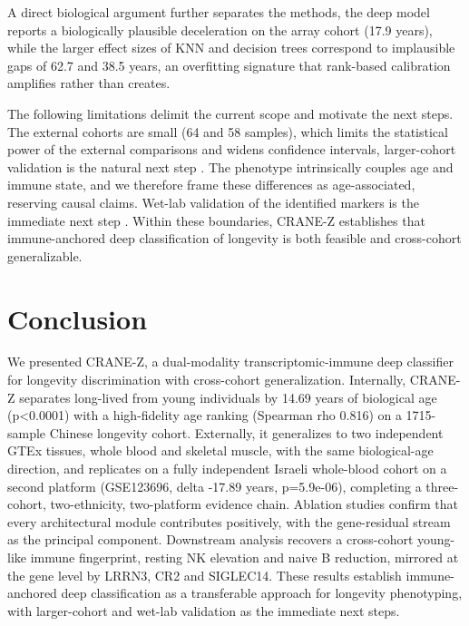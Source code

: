 \documentclass[unnumsec,webpdf,contemporary,large]{oup-authoring-template}
\begin{document}
A direct biological argument further separates the methods, the deep model reports a biologically plausible deceleration on the array cohort (17.9 years), while the larger effect sizes of KNN and decision trees correspond to implausible gaps of 62.7 and 38.5 years, an overfitting signature that rank-based calibration amplifies rather than creates.

The following limitations delimit the current scope and motivate the next steps. The external cohorts are small (64 and 58 samples), which limits the statistical power of the external comparisons and widens confidence intervals, larger-cohort validation is the natural next step \cite{lin2024external}. The phenotype intrinsically couples age and immune state, and we therefore frame these differences as age-associated, reserving causal claims. Wet-lab validation of the identified markers is the immediate next step \cite{li2024longevity,zhang2025cross,yao2025aging,cheng2025markers,lu2025clock,li2025deep,romano2024centenarian}. Within these boundaries, CRANE-Z establishes that immune-anchored deep classification of longevity is both feasible and cross-cohort generalizable.

\section{Conclusion}\label{sec:concl}
We presented CRANE-Z, a dual-modality transcriptomic-immune deep classifier for longevity discrimination with cross-cohort generalization. Internally, CRANE-Z separates long-lived from young individuals by 14.69 years of biological age (p<0.0001) with a high-fidelity age ranking (Spearman rho 0.816) on a 1715-sample Chinese longevity cohort. Externally, it generalizes to two independent GTEx tissues, whole blood and skeletal muscle, with the same biological-age direction, and replicates on a fully independent Israeli whole-blood cohort on a second platform (GSE123696, delta -17.89 years, p=5.9e-06), completing a three-cohort, two-ethnicity, two-platform evidence chain. Ablation studies confirm that every architectural module contributes positively, with the gene-residual stream as the principal component. Downstream analysis recovers a cross-cohort young-like immune fingerprint, resting NK elevation and naive B reduction, mirrored at the gene level by LRRN3, CR2 and SIGLEC14. These results establish immune-anchored deep classification as a transferable approach for longevity phenotyping, with larger-cohort and wet-lab validation as the immediate next steps.
\end{document}
